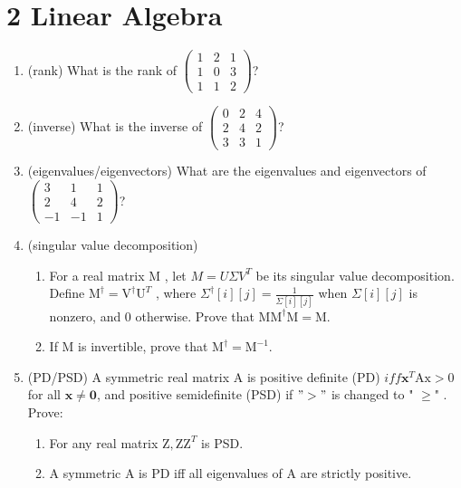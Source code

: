 \documentclass[12pt]{article}
\theoremstyle{definition}
\begin{document}
\section*{2 Linear Algebra}
\begin{enumerate}
    \item (rank)
    What is the rank of 
    $
    \begin{pmatrix}
        1 & 2 & 1\\
        1 & 0 & 3\\
        1 & 1 & 2
      \end{pmatrix}
    $?
    \item (inverse)
    What is the inverse of 
    $
    \begin{pmatrix}
        0 & 2 & 4\\
        2 & 4 & 2\\
        3 & 3 & 1
      \end{pmatrix}
    $?
    \item (eigenvalues/eigenvectors)
    What are the eigenvalues and eigenvectors of
    $
    \begin{pmatrix}
        3 & 1 & 1\\
        2 & 4 & 2\\
        -1 & -1 & 1
      \end{pmatrix}
    $?
    \item (singular value decomposition)
      \begin{enumerate}
        \item For a real matrix  M , let  $M=U \Sigma V^{T}$ be its singular value decomposition.
         Define  $\mathrm{M}^{\dagger}=\mathrm{V}^{\dagger} \mathrm{U}^{T}$ , where  $\Sigma^{\dagger}[i][j]=\frac{1}{\Sigma[i][j]}$  when  $\Sigma[i][j]$  is nonzero, and 0 otherwise. 
         Prove that  $\mathrm{MM}^{\dagger} \mathrm{M}=\mathrm{M} .$
         \item If  $\mathrm{M}$  is invertible, prove that $\mathrm{M}^{\dagger}=\mathrm{M}^{-1}.$
      \end{enumerate}
    \item (PD/PSD)
    A symmetric real matrix  $\mathrm{A}$  is positive definite (PD) $iff  \mathbf{x}^{T} \mathrm{Ax}>0$  for all  $\mathbf{x} \neq \mathbf{0}$,
     and positive semidefinite (PSD) if $">"$ is changed to " $\geq$" . Prove:
     \begin{enumerate}
       \item For any real matrix  $\mathrm{Z}, \mathrm{ZZ}^{T}$  is PSD.
       \item A symmetric  $\mathrm{A}$  is  $\mathrm{PD}$  iff all eigenvalues of  $\mathrm{A}$  are strictly positive.

\end{enumerate}
\end{enumerate}
\end{document}
